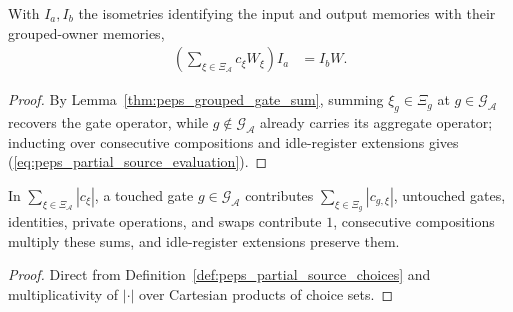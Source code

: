 \begin{lemma}
    \label{thm:peps_partial_source_evaluation}
    \leanok
    With $I_a,I_b$ the isometries identifying the input and output memories with
    their grouped-owner memories,
    \begin{align}
        \left(\sum_{\xi\in\Xi_{\mathcal A}}c_\xi W_\xi\right)I_a
         & = I_bW.
        \label{eq:peps_partial_source_evaluation}
    \end{align}
\end{lemma}

\begin{proof}
    \leanok
    By Lemma~\ref{thm:peps_grouped_gate_sum}, summing $\xi_g\in\Xi_g$ at
    $g\in\mathcal G_{\mathcal A}$ recovers the gate operator, while
    $g\notin\mathcal G_{\mathcal A}$ already carries its aggregate operator;
    inducting over consecutive compositions and idle-register extensions gives
    (\ref{eq:peps_partial_source_evaluation}).
\end{proof}

\begin{lemma}
    \label{thm:peps_partial_source_local_cost}
    \leanok
    In $\sum_{\xi\in\Xi_{\mathcal A}}|c_\xi|$, a touched gate $g\in\mathcal G_{\mathcal A}$
    contributes $\sum_{\xi\in\Xi_g}|c_{g,\xi}|$, untouched gates, identities,
    private operations, and swaps contribute $1$, consecutive compositions
    multiply these sums, and idle-register extensions preserve them.
\end{lemma}

\begin{proof}
    \leanok
    Direct from Definition~\ref{def:peps_partial_source_choices} and
    multiplicativity of $|\cdot|$ over Cartesian products of choice sets.
\end{proof}

